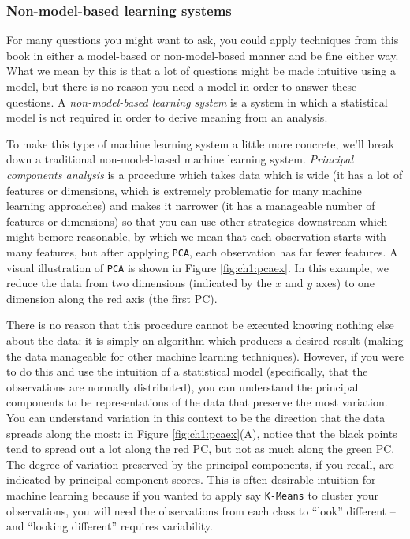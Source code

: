 \subsubsection{Non-model-based learning systems}

For many questions you might want to ask, you could apply techniques from this book in either a model-based or non-model-based manner and be fine either way. What we mean by this is that a lot of questions might be made {intuitive} using a model, but there is no reason you {need} a model in order to answer these questions. A \textit{non-model-based learning system} is a system in which a statistical model is {not} required in order to derive meaning from an analysis.

To make this type of machine learning system a little more concrete, we’ll break down a traditional non-model-based machine learning system. \textit{Principal components analysis} is a procedure which takes data which is {wide} (it has a lot of features or dimensions, which is extremely problematic for many machine learning approaches) and makes it narrower (it has a manageable number of features or dimensions) so that you can use other strategies downstream which might be{more reasonable}, by which we mean that each observation starts with many features, but after applying \texttt{PCA}, each observation has far fewer features. A visual illustration of \texttt{PCA} is shown in Figure \ref{fig:ch1:pcaex}. In this example, we reduce the data from two dimensions (indicated by the $x$ and $y$ axes) to one dimension along the red axis (the first PC).

There is no reason that this procedure cannot be {executed} knowing nothing else about the data: it is simply an algorithm which produces a desired result (making the data manageable for other machine learning techniques). However, if you were to do this and use the intuition of a statistical model (specifically, that the observations are {normally distributed}), you can understand the principal components to be representations of the data that preserve the most {variation}. You can understand variation in this context to be the direction that the data spreads along the most: in Figure \ref{fig:ch1:pcaex}(A), notice that the black points tend to spread out a lot along the red PC, but not as much along the green PC. The degree of variation preserved by the principal components, if you recall, are indicated by principal component scores. This is often desirable intuition for machine learning because if you wanted to apply say \texttt{K-Means} to cluster your observations, you will need the observations from each class to “look” different -- and “looking different” requires variability.

